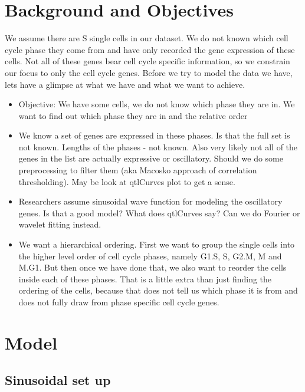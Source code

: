 \documentclass[11pt]{article}
\begin{document}
\section{Background and Objectives}

We assume there are S single cells in our dataset. We do not known which cell cycle phase they come from and have only recorded the gene expression of these cells. Not all of these genes bear cell cycle specific information, so we constrain our focus to only the cell cycle genes. Before we try to model the data we have, lets have a glimpse at what we have and what we want to achieve.

\begin{itemize}

\item  Objective: We have some cells, we do not know which phase they are in. We want to find out which phase they are in and the relative order

\item We know a set of genes are expressed in these phases. Is that the full set is not known. Lengths of the phases - not known. Also very likely not all of the genes in the list are actually expressive or oscillatory. Should we do some preprocessing to filter them (aka Macosko approach of correlation thresholding). May be look at qtlCurves plot to get a sense.

\item Researchers assume sinusoidal wave function for modeling the oscillatory genes. Is that a good model? What does qtlCurves say?
Can we do Fourier or wavelet fitting instead.

\item We want a hierarchical ordering. First we want to group the single cells into the  higher level order of cell cycle phases, namely G1.S, S, G2.M, M and M.G1. But then once we have done that, we also want to reorder the cells inside each of these phases. That is a little extra than just  finding the ordering of the cells, because that does not tell us which phase it is from and does not fully draw from phase specific cell cycle genes.

\end{itemize}


\section{Model}

\subsection{Sinusoidal set up}
\end{document}
